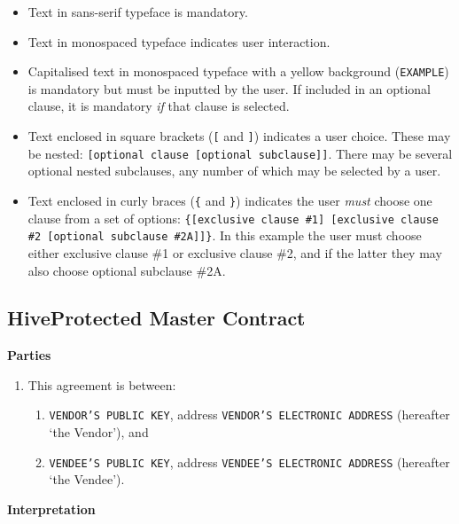 \documentclass[a4paper,12pt]{article}
\begin{document}
\begin{itemize}
	\item Text in sans-serif typeface is mandatory.
	\item Text in monospaced typeface indicates user interaction.
	\item Capitalised text in monospaced typeface with a yellow background (\texttt{\colorbox{branding}{EXAMPLE}}) is mandatory but must be inputted by the user. If included in an optional clause, it is mandatory \textit{if} that clause is selected.
	\item Text enclosed in square brackets (\texttt{[} and \texttt{]}) indicates a user choice. These may be nested: \texttt{[optional clause [optional subclause]]}. There may be several optional nested subclauses, any number of which may be selected by a user.
	\item Text enclosed in curly braces (\texttt{\{} and \texttt{\}}) indicates the user \textit{must} choose one clause from a set of options: \texttt{\{[exclusive clause \#1] [exclusive clause \#2 [optional subclause \#2A]]\}}. In this example the user must choose either exclusive clause \#1 or exclusive clause \#2, and if the latter they may also choose optional subclause \#2A.
\end{itemize}

\subsection{HiveProtected Master Contract}

\raggedright

\textbf{Parties}

\begin{enumerate}
	\item This agreement is between:
	\begin{enumerate}
		\item \texttt{\colorbox{branding}{VENDOR'S PUBLIC KEY}}, address \texttt{\colorbox{branding}{VENDOR'S ELECTRONIC ADDRESS}} (hereafter `the Vendor'), and
		\item \texttt{\colorbox{branding}{VENDEE'S PUBLIC KEY}}, address \texttt{\colorbox{branding}{VENDEE'S ELECTRONIC ADDRESS}} (hereafter `the Vendee').
	\end{enumerate}
\end{enumerate}

\textbf{Interpretation}
\end{document}
